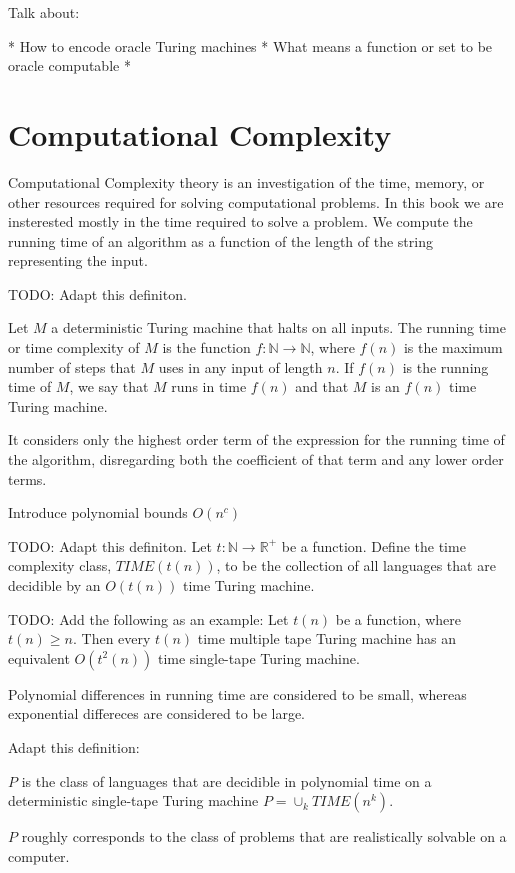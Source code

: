 Talk about:

 * How to encode oracle Turing machines
 * What means a function or set to be oracle computable
 * 

%
%

\section{Computational Complexity}
\label{sec:computational_complexity}

{\color{red} Computational Complexity theory is an investigation of the time, memory, or other resources required for solving computational problems.} In this book we are insterested mostly in the time required to solve a problem. {\color{red} We compute the running time of an algorithm as a function of the length of the string representing the input.}

{\color{red} TODO: Adapt this definiton.}
\begin{definition}
Let $M$ a deterministic Turing machine that halts on all inputs. The running time or time complexity of $M$ is the function $f:\mathbb{N}\rightarrow\mathbb{N}$, where $f(n)$ is the maximum number of steps that $M$ uses in any input of length $n$. If $f(n)$ is the running time of $M$, we say that $M$ runs in time $f(n)$ and that $M$ is an $f(n)$ time Turing machine.
\end{definition}

{\color{red} It considers only the highest order term of the expression for the running time of the algorithm, disregarding both the coefficient of that term and any lower order terms.}

{\color{red} Introduce polynomial bounds $O(n^c)$}

{\color{red} TODO: Adapt this definiton.}
Let $t:\mathbb{N}\rightarrow\mathbb{R}^{+}$ be a function. Define the time complexity class, $TIME(t(n))$, to be the collection of all languages that are decidible by an $O(t(n))$ time Turing machine.

{\color{red} TODO: Add the following as an example:
Let $t(n)$ be a function, where $t(n)\geq n$. Then every $t(n)$ time multiple tape Turing machine has an equivalent $O(t^{2}(n))$ time single-tape Turing machine.
}

{\color{red} Polynomial differences in running time are considered to be small, whereas exponential differeces are considered to be large.}


{\color{red} Adapt this definition:
\begin{definition}
$P$ is the class of languages that are decidible in polynomial time on a deterministic single-tape Turing machine $P=\cup_{k}TIME(n^{k})$.
\end{definition} 

$P$ roughly corresponds to the class of problems that are realistically solvable on a computer.}

